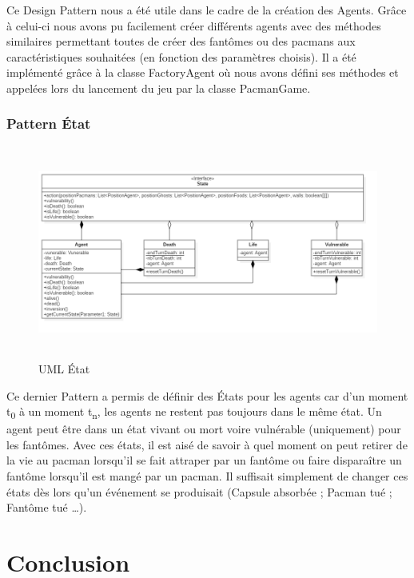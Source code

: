 \documentclass[a4paper, 11pt]{article}
\begin{document}
Ce Design Pattern nous a été utile dans le cadre de la création des Agents. Grâce à celui-ci nous avons pu facilement créer différents agents avec des
méthodes similaires permettant toutes de créer des fantômes ou des pacmans aux caractéristiques souhaitées (en fonction des paramètres choisis). Il a été implémenté grâce à la classe 
FactoryAgent où nous avons défini ses méthodes et appelées lors du lancement du jeu par la classe PacmanGame. \\

\section*{Pattern État}

\begin{figure}[H]
  \begin{center}
  \includegraphics[height=7cm]{img/png/state}
  \end{center}
  \caption[schema]{UML État}
\end{figure}

Ce dernier Pattern a permis de définir des États pour les agents car d'un moment t\textsubscript{0} à un moment t\textsubscript{n}, les agents ne restent pas 
toujours dans le même état. Un agent peut être dans un état vivant ou mort voire vulnérable (uniquement) pour les fantômes. Avec ces états, 
il est aisé de savoir à quel moment on peut retirer de la vie au pacman lorsqu'il se fait attraper par un fantôme
ou faire disparaître un fantôme lorsqu'il est mangé par un pacman. Il suffisait simplement de changer ces états dès lors qu'un événement se 
produisait (Capsule absorbée ; Pacman tué ; Fantôme tué \ldots). 

\part*{Conclusion}
\end{document}
